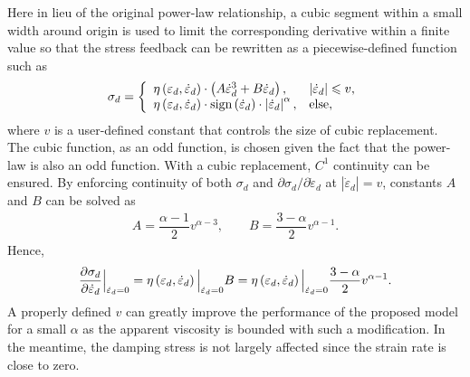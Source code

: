 Here in lieu of the original power-law relationship, a cubic segment within a small width around origin is used to limit the corresponding derivative within a finite value so that the stress feedback can be rewritten as a piecewise-defined function such as
\begin{gather}
\sigma_d=\left\{
\begin{array}{ll}
\eta\left(\varepsilon_d,\dot\varepsilon_d\right)\cdot\left(A\dot{\varepsilon}_d^3+B\dot{\varepsilon}_d\right),&\left\lvert\dot{\varepsilon}_d\right\rvert\leqslant{}v,\\
\eta\left(\varepsilon_d,\dot\varepsilon_d\right)\cdot\text{sign}\left(\dot{\varepsilon}_d\right)\cdot\left\lvert\dot{\varepsilon}_d\right\rvert^{\alpha},&\text{else},
\end{array}
\right.
\end{gather}
where $v$ is a user-defined constant that controls the size of cubic replacement. The cubic function, as an odd function, is chosen given the fact that the power-law  is also an odd function. With a cubic replacement, $C^1$ continuity can be ensured. By enforcing continuity of both $\sigma_d$ and $\partial\sigma_d/\partial\dot\varepsilon_d$ at $\left\lvert\dot{\varepsilon}_d\right\rvert=v$, constants $A$ and $B$ can be solved as
\begin{gather}
A=\dfrac{\alpha-1}{2}v^{\alpha-3},\qquad
B=\dfrac{3-\alpha}{2}v^{\alpha-1}.
\end{gather}
Hence,
\begin{gather}\label{eq:max_der}
\dfrac{\partial{\sigma_d}}{\partial{\dot{\varepsilon}_d}}\Big\vert_{\dot{\varepsilon}_d=0}=\eta\left(\varepsilon_d,\dot\varepsilon_d\right)\Big\vert_{\dot{\varepsilon}_d=0}B=\eta\left(\varepsilon_d,\dot\varepsilon_d\right)\Big\vert_{\dot{\varepsilon}_d=0}\dfrac{3-\alpha}{2}v^{\alpha-1}.
\end{gather}
A properly defined $v$ can greatly improve the performance of the proposed model for a small $\alpha$ as the apparent viscosity is bounded with such a modification. In the meantime, the damping stress is not largely affected since the strain rate is close to zero.
